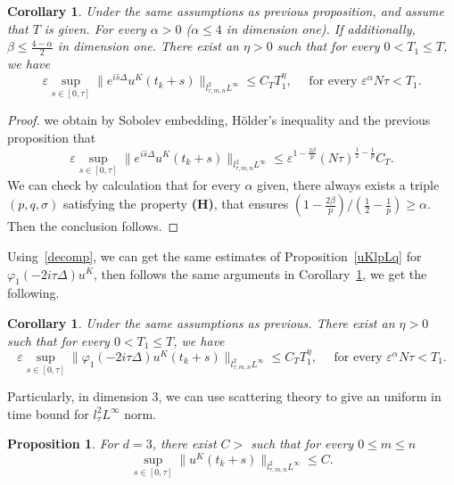 \documentclass[10pt,a4paper]{article}
\newtheorem{corollary}[theorem]{Corollary}
\newtheorem{proposition}[theorem]{Proposition}
\begin{document}
  \begin{corollary}\label{uKl2Linfty}
    Under the same assumptions as previous proposition, and assume that \(T\) is
    given. For every \(\alpha > 0\) (\(\alpha\leq4\) in dimension one). If 
    additionally, \(\beta\leq\frac{4-\alpha}2\) in dimension one. There exist
    an \(\eta>0\) such that for every \(0< T_1 \leq T\), we have 
    \[ \varepsilon \sup_{s\in[0,\tau]} \|e^{i\hat{s}\Delta}u^K(t_k+s)\|_{l^2_{\tau,m,n}L^\infty} 
    \leq C_T T_1^\eta, \quad \text{ for every } \varepsilon^\alpha N \tau < T_1. \]
  \end{corollary}

  \begin{proof}
    we obtain by Sobolev embedding, H\"older's inequality and the previous
    proposition that 
    \[ \varepsilon \sup_{s\in[0,\tau]} \|e^{i\hat{s}\Delta}u^K(t_k+s)\|_{l^2_{\tau,m,n}L^\infty}
    \leq \varepsilon^{1-\frac{2\beta}p} (N\tau)^{\frac12-\frac1p} C_T. \]
    We can check by calculation that for every \(\alpha\) given, there 
    always exists a triple \((p,q,\sigma)\) satisfying the property {\bf (H)}, 
    that ensures \((1-\frac{2\beta}p)/(\frac12-\frac1p) \geq \alpha\). Then the
    conclusion follows.
  \end{proof}

  Using~\eqref{decomp}, we can get the same estimates of Proposition~\ref{uKlpLq} 
  for \(\varphi_1(-2i\tau\Delta)u^K\), then follows the same arguments in
  Corollary~\ref{uKl2Linfty}, we get the following.

  \begin{corollary}
    Under the same assumptions as previous. There exist
    an \(\eta>0\) such that for every \(0< T_1 \leq T\), we have 
    \[ \varepsilon \sup_{s\in[0,\tau]} \|\varphi_1(-2i\tau\Delta)u^K(t_k+s)\|_{l^2_{\tau,m,n}L^\infty} 
    \leq C_T T_1^\eta, \quad \text{ for every } \varepsilon^\alpha N \tau < T_1. \]
  \end{corollary}

  Particularly, in dimension 3, we can use scattering theory to give an uniform
  in time bound for \(l^2_\tau L^\infty\) norm. 

  \begin{proposition}
    For \(d=3\), there exist \(C>\) such that for every \(0\leq m\leq n\)
    \[ \sup_{s\in[0,\tau]} \|u^K(t_k+s)\|_{l^2_{\tau,m,n}L^\infty} 
    \leq C. \]
  \end{proposition}
\end{document}
